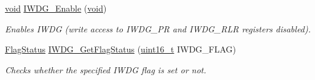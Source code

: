 \begin{DoxyCompactItemize}
\hyperlink{usb__devapi_8h_afabf60e7f57651d6d595a02c75f07cd0}{void} \hyperlink{group___i_w_d_g___private___functions_ga479b2921c86f8c67b819f5c4bea6bdb6}{I\+W\+D\+G\+\_\+\+Enable} (\hyperlink{usb__devapi_8h_afabf60e7f57651d6d595a02c75f07cd0}{void})
\begin{DoxyCompactList}\small\item\em Enables I\+W\+DG (write access to I\+W\+D\+G\+\_\+\+PR and I\+W\+D\+G\+\_\+\+R\+LR registers disabled). \end{DoxyCompactList}\item 
\hyperlink{agilefox_2library_2inc_2stm32f10x__type_8h_a89136caac2e14c55151f527ac02daaff}{Flag\+Status} \hyperlink{group___i_w_d_g___private___functions_ga37f050cfbedc0c15f9e0816c0b22011e}{I\+W\+D\+G\+\_\+\+Get\+Flag\+Status} (\hyperlink{_p_e___types_8h_a1f1825b69244eb3ad2c7165ddc99c956}{uint16\+\_\+t} I\+W\+D\+G\+\_\+\+F\+L\+AG)
\begin{DoxyCompactList}\small\item\em Checks whether the specified I\+W\+DG flag is set or not. \end{DoxyCompactList}\end{DoxyCompactItemize}
